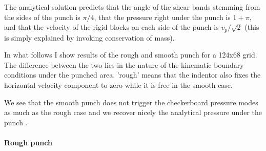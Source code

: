 The analytical solution predicts that the angle of the shear bands stemming from the sides of the punch 
is $\pi/4$, that the pressure right under the punch is $1+\pi$, 
and that the velocity of the rigid blocks on each side of the punch is $v_p/\sqrt{2}$ 
(this is simply explained by invoking conservation of mass).

In what follows I show results of the rough and smooth punch for a 124x68 grid. The difference between the two
lies in the nature of the kinematic boundary conditions under the punched area. 'rough' means that the indentor 
also fixes the horizontal velocity component to zero while it is free in the smooth case.

We see that the smooth punch does not trigger the checkerboard pressure modes as much as the rough case 
and we recover nicely the analytical pressure under the punch \cite{thfb08,gltf18}.

\newpage
\paragraph{Rough punch} 

